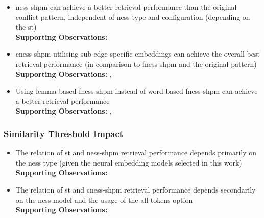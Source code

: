 \documentclass[11pt, numbers=noenddot]{scrreprt}
\begin{document}
\begin{itemize}

\item \gls{ness-shpm} can achieve a better retrieval performance than the original conflict pattern, independent of \gls{ness} type and configuration (depending on the \gls{st}) \\
\textbf{Supporting Observations:} 

\item \gls{cness-shpm} utilising sub-edge specific embeddings can achieve the overall best retrieval performance (in comparison to \gls{fness-shpm} and the original pattern) \\
\textbf{Supporting Observations:} , 

\item Using lemma-based \gls{fness-shpm} instead of word-based \gls{fness-shpm} can achieve a better retrieval performance \\
\textbf{Supporting Observations:} , 

\end{itemize}


\subsubsection{Similarity Threshold Impact}

\begin{itemize}

\item The relation of \gls{st} and \gls{ness-shpm} retrieval performance depends primarily on the \gls{ness} type (given the neural embedding models selected in this work)\\
\textbf{Supporting Observations:}   

\item The relation of \gls{st} and \gls{cness-shpm} retrieval performance depends secondarily on the \gls{ness} model and the usage of the all tokens option \\
\textbf{Supporting Observations:}   

\end{itemize}
\end{document}

